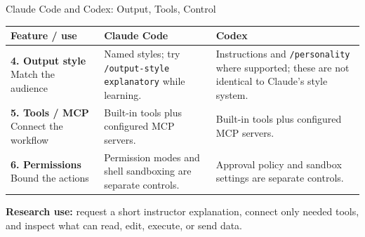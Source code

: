 \begin{frame}{Claude Code and Codex: Output, Tools, Control}
\small
\renewcommand{\arraystretch}{1.22}
\begin{tabular}{>{\raggedright\arraybackslash}p{2.35cm}>{\raggedright\arraybackslash}p{5.1cm}>{\raggedright\arraybackslash}p{5.1cm}}
\toprule
\textbf{Feature / use} & \textbf{Claude Code} & \textbf{Codex} \\
\midrule
\textbf{4. Output style} \newline Match the audience & Named styles; try \texttt{/output-style explanatory} while learning. & Instructions and \texttt{/personality} where supported; these are not identical to Claude's style system. \\
\textbf{5. Tools / MCP} \newline Connect the workflow & Built-in tools plus configured MCP servers. & Built-in tools plus configured MCP servers. \\
\textbf{6. Permissions} \newline Bound the actions & Permission modes and shell sandboxing are separate controls. & Approval policy and sandbox settings are separate controls. \\
\bottomrule
\end{tabular}
\par\vspace{0.25cm}
\normalsize
\textbf{Research use:} request a short instructor explanation, connect only needed tools, and inspect what can read, edit, execute, or send data.
\par\vfill
{}
\end{frame}

